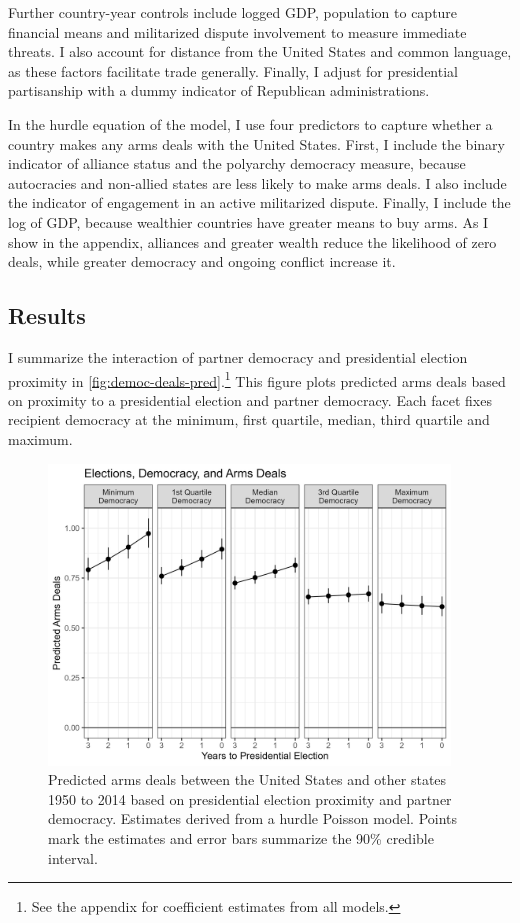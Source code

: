 \documentclass[12pt]{article}
\begin{document}
Further country-year controls include logged GDP, population to capture financial means and militarized dispute involvement to measure immediate threats.
I also account for distance from the United States and common language, as these factors facilitate trade generally. 
Finally, I adjust for presidential partisanship with a dummy indicator of Republican administrations.  


In the hurdle equation of the model, I use four predictors to capture whether a country makes any arms deals with the United States. 
First, I include the binary indicator of alliance status and the polyarchy democracy measure, because autocracies and non-allied states are less likely to make arms deals. 
I also include the indicator of engagement in an active militarized dispute. 
Finally, I include the log of GDP, because wealthier countries have greater means to buy arms.
As I show in the appendix, alliances and greater wealth reduce the likelihood of zero deals, while greater democracy and ongoing conflict increase it. 


\subsection{Results}


I summarize the interaction of partner democracy and presidential election proximity in \autoref{fig:democ-deals-pred}.\footnote{See the appendix for coefficient estimates from all models.}
This figure plots predicted arms deals based on proximity to a presidential election and partner democracy.
Each facet fixes recipient democracy at the minimum, first quartile, median, third quartile and maximum.


\begin{figure}[htpb]
	\centering
		\includegraphics[width=0.95\textwidth]{../figures/democ-deals-pred.png}
	\caption{Predicted arms deals between the United States and other states 1950 to 2014 based on presidential election proximity and partner democracy. Estimates derived from a hurdle Poisson model. Points mark the estimates and error bars summarize the 90\% credible interval.}
	\label{fig:democ-deals-pred}
\end{figure}
\end{document}
